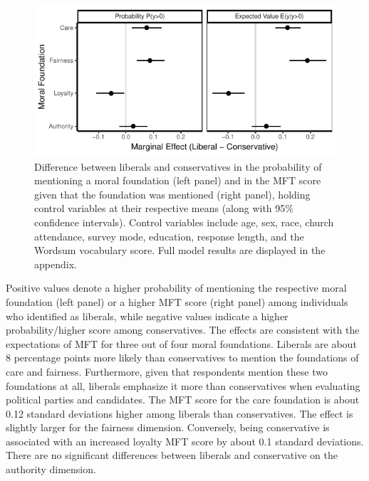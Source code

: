 \documentclass[12pt]{article}
\begin{document}
\begin{figure}[ht]\centering
\includegraphics{../calc/fig/tobit_ideol.pdf}
\caption{Difference between liberals and conservatives in the probability of mentioning a moral foundation (left panel) and in the MFT score given that the foundation was mentioned (right panel), holding control variables at their respective means (along with 95\% confidence intervals). Control variables include age, sex, race, church attendance, survey mode, education, response length, and the Wordsum vocabulary score. Full model results are displayed in the appendix.
}\label{fig:tobit_ideol}
\end{figure}

Positive values denote a higher probability of mentioning the respective moral foundation (left panel) or a higher MFT score (right panel) among individuals who identified as liberals, while negative values indicate a higher probability/higher score among conservatives. The effects are consistent with the expectations of MFT for three out of four moral foundations. Liberals are about 8 percentage points more likely than conservatives to mention the foundations of care and fairness. Furthermore, given that respondents mention these two foundations at all, liberals emphasize it more than conservatives when evaluating political parties and candidates. The MFT score for the care foundation is about 0.12 standard deviations higher among liberals than conservatives. The effect is slightly larger for the fairness dimension. Conversely, being conservative is associated with an increased loyalty MFT score by about 0.1 standard deviations. There are no significant differences between liberals and conservative on the authority dimension.

\end{document}
